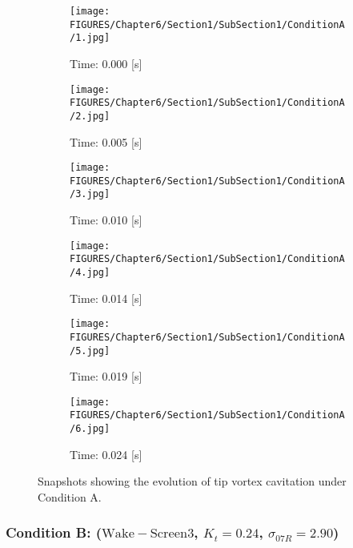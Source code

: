 \begin{figure}[!htb]
    \centering
    \begin{subfigure}[b]{0.31\textwidth}
        \texttt{[image: FIGURES/Chapter6/Section1/SubSection1/ConditionA/1.jpg]}
        \caption{Time: 0.000 [s]}
        \label{fig:0A}
    \end{subfigure}
    \hfill
    \begin{subfigure}[b]{0.31\textwidth}
        \texttt{[image: FIGURES/Chapter6/Section1/SubSection1/ConditionA/2.jpg]}
        \caption{Time: 0.005 [s]}
        \label{fig:5A}
    \end{subfigure}
    \hfill
    \begin{subfigure}[b]{0.31\textwidth}
        \texttt{[image: FIGURES/Chapter6/Section1/SubSection1/ConditionA/3.jpg]}
        \caption{Time: 0.010 [s]}
        \label{fig:10A}
    \end{subfigure}
    \medskip
    \begin{subfigure}[b]{0.31\textwidth}
        \texttt{[image: FIGURES/Chapter6/Section1/SubSection1/ConditionA/4.jpg]}
        \caption{Time: 0.014 [s]}
        \label{fig:14A}
    \end{subfigure}
    \hfill
    \begin{subfigure}[b]{0.31\textwidth}
        \texttt{[image: FIGURES/Chapter6/Section1/SubSection1/ConditionA/5.jpg]}
        \caption{Time: 0.019 [s]}
        \label{fig:19A}
    \end{subfigure}
    \hfill
    \begin{subfigure}[b]{0.31\textwidth}
        \texttt{[image: FIGURES/Chapter6/Section1/SubSection1/ConditionA/6.jpg]}
        \caption{Time: 0.024 [s]}
        \label{fig:24A}
    \end{subfigure}
    \caption{Snapshots showing the evolution of tip vortex cavitation under Condition A.}
    \label{fig:SnapshotA}
\end{figure}

\subsubsection{Condition B: ($\mathrm{Wake-Screen3}$, $K_t = 0.24$, $\sigma_{07R} = 2.90$)}
\label{sez:B}

